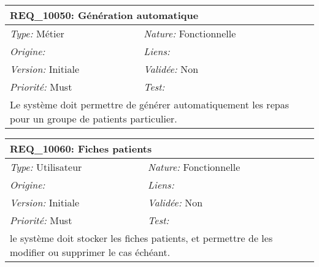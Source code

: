 \begin{table}[!ht]

\begin{tabular}{|p{60mm}p{100mm}|}

\hline

\multicolumn{2}{|l|}{\textbf{REQ\_10050:} Génération automatique} \\ \hline

\emph{Type:} Métier & \emph{Nature:} Fonctionnelle \\

\emph{Origine:}  & \emph{Liens:}  \\

\emph{Version:} Initiale & \emph{Validée:} Non \\

\emph{Priorité:} Must & \emph{Test:} \\ \hline

\multicolumn{2}{|p{16cm}|}{Le système doit permettre de générer automatiquement les repas pour un groupe de patients particulier.} \\ \hline

\end{tabular}

\end{table}



\begin{table}[!ht]

\begin{tabular}{|p{60mm}p{100mm}|}

\hline

\multicolumn{2}{|l|}{\textbf{REQ\_10060:} Fiches patients} \\ \hline

\emph{Type:} Utilisateur & \emph{Nature:} Fonctionnelle \\

\emph{Origine:}  & \emph{Liens:}  \\

\emph{Version:} Initiale & \emph{Validée:} Non \\

\emph{Priorité:} Must & \emph{Test:} \\ \hline

\multicolumn{2}{|p{16cm}|}{le système doit stocker les fiches patients, et permettre de les modifier ou supprimer le cas échéant.} \\ \hline

\end{tabular}

\end{table}




